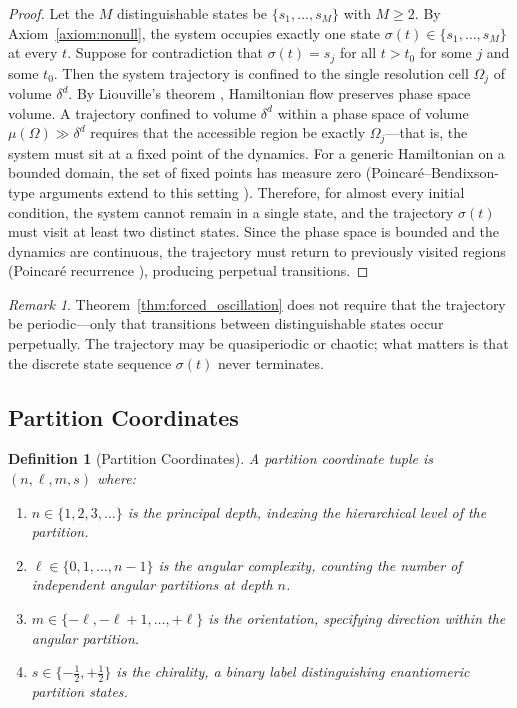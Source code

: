 \documentclass[twocolumn,10pt]{article}
\newtheorem{definition}[theorem]{Definition}
\theoremstyle{remark}
\newtheorem{remark}[theorem]{Remark}
\begin{document}
\begin{proof}
Let the $M$ distinguishable states be $\{s_1, \ldots, s_M\}$ with $M \geq 2$.
By Axiom~\ref{axiom:nonull}, the system occupies exactly one state $\sigma(t) \in \{s_1,\ldots,s_M\}$ at every $t$.
Suppose for contradiction that $\sigma(t) = s_j$ for all $t > t_0$ for some $j$ and some $t_0$.
Then the system trajectory is confined to the single resolution cell $\Omega_j$ of volume $\delta^d$.
By Liouville's theorem \cite{liouville1838,arnold1989}, Hamiltonian flow preserves phase space volume.
A trajectory confined to volume $\delta^d$ within a phase space of volume $\mu(\Omega) \gg \delta^d$ requires that the accessible region be exactly $\Omega_j$---that is, the system must sit at a fixed point of the dynamics.
For a generic Hamiltonian on a bounded domain, the set of fixed points has measure zero (Poincar\'{e}--Bendixson-type arguments extend to this setting \cite{poincare1890}).
Therefore, for almost every initial condition, the system cannot remain in a single state, and the trajectory $\sigma(t)$ must visit at least two distinct states.
Since the phase space is bounded and the dynamics are continuous, the trajectory must return to previously visited regions (Poincar\'{e} recurrence \cite{poincare1890}), producing perpetual transitions.
\end{proof}

\begin{remark}
\label{rem:oscillation}
Theorem~\ref{thm:forced_oscillation} does not require that the trajectory be periodic---only that transitions between distinguishable states occur perpetually.
The trajectory may be quasiperiodic or chaotic; what matters is that the discrete state sequence $\sigma(t)$ never terminates.
\end{remark}

\subsection{Partition Coordinates}

\begin{definition}[Partition Coordinates]
\label{def:partition_coords}
A \emph{partition coordinate tuple} is $(n, \ell, m, s)$ where:
\begin{enumerate}[label=(\roman*)]
    \item $n \in \{1, 2, 3, \ldots\}$ is the \emph{principal depth}, indexing the hierarchical level of the partition.
    \item $\ell \in \{0, 1, \ldots, n-1\}$ is the \emph{angular complexity}, counting the number of independent angular partitions at depth $n$.
    \item $m \in \{-\ell, -\ell+1, \ldots, +\ell\}$ is the \emph{orientation}, specifying direction within the angular partition.
    \item $s \in \{-\tfrac{1}{2}, +\tfrac{1}{2}\}$ is the \emph{chirality}, a binary label distinguishing enantiomeric partition states.
\end{enumerate}
\end{definition}
\end{document}
